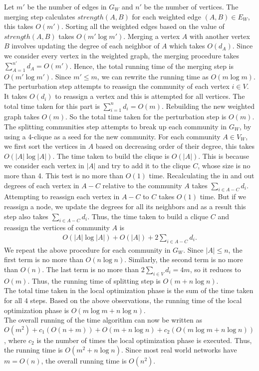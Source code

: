 \begin{spacing}{1.5}
\indent Let $m'$ be the number of edges in $G_W$ and $n'$ be the number of vertices. The merging step calculates $strength(A, B)$ for each weighted edge $(A, B)\in E_W$, this takes $O(m')$. Sorting all the weighted edges based on the value of $strength(A, B)$ takes $O(m'\log m')$. Merging a vertex $A$ with another vertex $B$ involves updating the degree of each neighbor of $A$ which takes $O(d_A)$. Since we consider every vertex in the weighted graph, the merging procedure takes $\displaystyle\sum_{A=1}^{n'} d_A = O(m')$. Hence, the total running time of the merging step is $O(m'\log m')$. Since $m'\leq m$, we can rewrite the running time as $O(m\log m)$.\\
\indent The perturbation step attempts to reassign the community of each vertex $i\in V$. It takes $O(d_i)$ to reassign a vertex and this is attempted for all vertices. The total time taken for this part is $\displaystyle\sum_{i=1}^n d_i = O(m)$. Rebuilding the new weighted graph takes $O(m)$. So the total time taken for the perturbation step is $O(m)$.\\
\indent The splitting communities step attempts to break up each community in $G_W$, by using a 4-clique as a seed for the new community. For each community $A \in V_W$, we first sort the vertices in $A$ based on decreasing order of their degree, this takes $O(|A|\log|A|)$. The time taken to build the clique is $O(|A|)$. This is because we consider each vertex in $|A|$ and try to add it to the clique $C$, whose size is no more than 4. This test is no more than $O(1)$ time. Recalculating the in and out degrees of each vertex in $A-C$ relative to the community $A$ takes $\displaystyle\sum_{i\in A-C}d_i$. Attempting to reassign each vertex in $A-C$ to $C$ takes $O(1)$ time. But if we reassign a node, we update the degrees for all its neighbors and as a result this step also takes $\displaystyle\sum_{i\in A-C}d_i$. Thus, the time taken to build a clique $C$ and reassign the vertices of community $A$ is
\begin{align}
O(|A|\log|A|) + O(|A|) + 2\displaystyle\sum_{i\in A-C}d_i.
\end{align}
We repeat the above procedure for each community in $G_W$. Since $|A|\leq n$, the first term is no more than $O(n\log n)$. Similarly, the second term is no more than $O(n)$. The last term is no more than $2\displaystyle\sum_{i\in V}d_i = 4m$, so it reduces to $O(m)$. Thus, the running time of splitting step is $O(m+n\log n)$.\\
\indent The total time taken in the local optimization phase is the sum of the time taken for all 4 steps. Based on the above observations, the running time of the local optimization phase is $O(m\log m+n\log n)$.\\
\indent The overall running of the time algorithm can now be written as $O(m^2) + c_1(O(n+m))+O(m+n\log n)+c_2(O(m\log m+n\log n))$, where $c_2$ is the number of times the local optimization phase is executed. Thus, the running time is $O(m^2+n\log n)$. Since most real world networks have $m=O(n)$, the overall running time is $O(n^2)$.
\end{spacing}